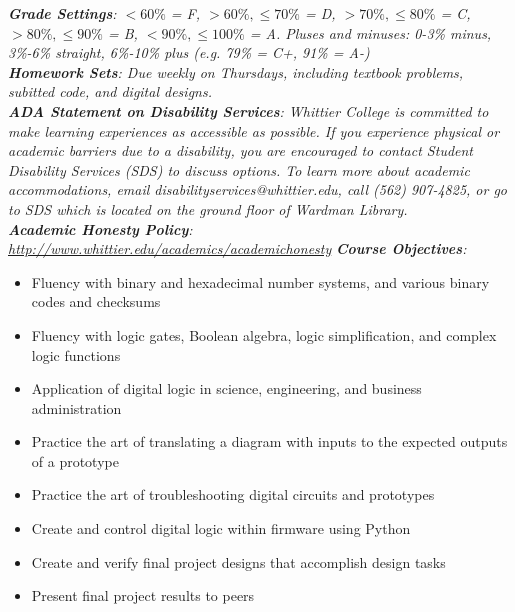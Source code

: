 \documentclass[10pt]{article}
\begin{document}
\textit{\textbf{Grade Settings}: $<60\%$ = F, $>60\%,\leq 70\%$ = D, $>70\%,\leq80\%$ = C, $>80\%,\leq 90\%$ = B, $<90\%,\leq 100\%$ = A.  Pluses and minuses: 0-3\% minus, 3\%-6\% straight, 6\%-10\% plus (e.g. 79\% = C+, 91\% = A-)} \\
\textit{\textbf{Homework Sets}: Due weekly on Thursdays, including textbook problems, subitted code, and digital designs.} \\
\textit{\textbf{ADA Statement on Disability Services}: Whittier College is committed to make learning experiences as accessible as possible. If you experience physical or academic barriers due to a disability, you are encouraged to contact Student Disability Services (SDS) to discuss options. To learn more about academic accommodations, email disabilityservices@whittier.edu, call (562) 907-4825, or go to SDS which is located on the ground floor of Wardman Library.} \\
\textit{\textbf{Academic Honesty Policy}: \url{http://www.whittier.edu/academics/academichonesty}}
\clearpage
\textit{\textbf{Course Objectives}:}
\begin{itemize}
\item Fluency with binary and hexadecimal number systems, and various binary codes and checksums
\item Fluency with logic gates, Boolean algebra, logic simplification, and complex logic functions
\item Application of digital logic in science, engineering, and business administration
\item Practice the art of translating a diagram with inputs to the expected outputs of a prototype
\item Practice the art of troubleshooting digital circuits and prototypes
\item Create and control digital logic within firmware using Python
\item Create and verify final project designs that accomplish design tasks
\item Present final project results to peers
\end{itemize}
\end{document}
